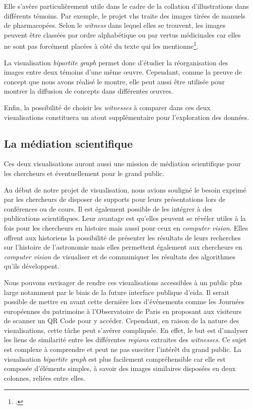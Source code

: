 Elle s'avère particulièrement utile dans le cadre de la collation d'illustrations dans différents témoins. Par exemple, le projet \gls{vhs} traite des images tirées de manuels de pharmacopées. 
Selon le \textit{witness} dans lequel elles se trouvent, les images peuvent être classées par ordre alphabétique ou par vertus médicinales car elles ne sont pas forcément placées à côté du texte qui les mentionne\footcite{kaouaImageCollationMatching2021}. 

La visualisation \textit{bipartite graph} permet donc d'étudier la réorganisation des images entre deux témoins d'une même œuvre. Cependant, comme la preuve de concept que nous avons réalisé le montre, elle peut aussi être utilisée pour montrer la diffusion de concepts dans différentes œuvres. 

Enfin, la possibilité de choisir les \textit{witnesses} à comparer dans ces deux visualisations constituera un atout supplémentaire pour l'exploration des données.


\subsection{La médiation scientifique}

Ces deux visualisations auront aussi une mission de médiation scientifique pour les chercheurs et éventuellement pour le grand public.

Au début de notre projet de visualisation, nous avions souligné le besoin exprimé par les chercheurs de disposer de supports pour leurs présentations lors de conférences ou de cours. Il est également possible de les intégrer à des publications scientifiques. Leur avantage est qu'elles peuvent se révéler utiles à la fois pour les chercheurs en histoire mais aussi pour ceux en \textit{computer vision}. Elles offrent aux historiens la possibilité de présenter les résultats de leurs recherches sur l'histoire de l'astronomie mais elles permettent également aux chercheurs en \textit{computer vision} de visualiser et de communiquer les résultats des algorithmes qu'ils développent. 

Nous pouvons envisager de rendre ces visualisations accessibles à un public plus large notamment par le biais de la future interface publique d'\gls{eida}. Il serait possible de mettre en avant cette dernière lors d'événements comme les Journées européennes du patrimoine à l'Observatoire de Paris en proposant aux visiteurs de scanner un QR Code pour y accéder. Cependant, en raison de la nature des visualisations, cette tâche peut s'avérer compliquée. En effet, le but est d'analyser les liens de similarité entre les différentes \textit{regions} extraites des \textit{witnesses}. Ce sujet est complexe à comprendre et peut ne pas susciter l'intérêt du grand public. La visualisation \textit{bipartite graph} est plus facilement compréhensible car elle est composée d'éléments simples, à savoir des images similaires disposées en deux colonnes, reliées entre elles.

